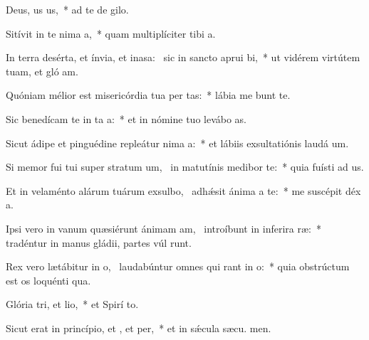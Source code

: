 \item Deus, us us,~* ad te de  gilo.
\item Sitívit in te nima a,~* quam multiplíciter tibi  a.
\item In terra desérta, et ínvia, et inasa:~\pscross{} sic in sancto aprui bi,~* ut vidérem virtútem tuam, et gló am.
\item Quóniam mélior est misericórdia tua per tas:~* lábia me bunt te.
\item Sic benedícam te in ta a:~* et in nómine tuo levábo  as.
\item Sicut ádipe et pinguédine repleátur nima a:~* et lábiis exsultatiónis laudá  um.
\item Si memor fui tui super stratum um,~\pscross{} in matutínis medibor  te:~* quia fuísti ad us.
\item Et in velaménto alárum tuárum exsulbo,~\pscross{} adhǽsit ánima a  te:~* me suscépit déx a.
\item Ipsi vero in vanum quæsiérunt ánimam am,~\pscross{} introíbunt in inferira ræ:~* tradéntur in manus gládii, partes vúl runt.
\item Rex vero lætábitur in o,~\pscross{} laudabúntur omnes qui rant in o:~* quia obstrúctum est os loquénti qua.
\item Glória tri, et lio,~* et Spirí to.
\item Sicut erat in princípio, et , et per,~* et in sǽcula sæcu. men.
